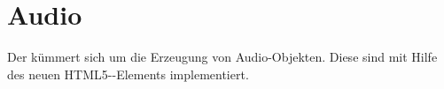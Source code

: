 \chapter{Audio}

Der  kümmert sich um die Erzeugung von Audio-Objekten. Diese sind mit Hilfe des neuen HTML5--Elements implementiert.